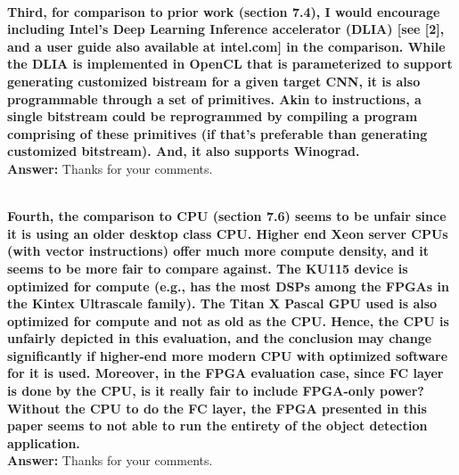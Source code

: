 \documentclass[12pt]{paper}
\newcommand{\rev}[1]{{{\color[rgb]{0,0,1}{#1}}}}
\newcommand{\answer}[1]{\noindent\textbf{Answer:} #1}
\newcommand{\comment}[1]{\noindent\textbf{\\ #1}\\}
\begin{document}
\comment{Third, for comparison to prior work (section 7.4), I would encourage including Intel’s Deep Learning Inference accelerator (DLIA) [see [2], and a user guide also available at intel.com] in the comparison. While the DLIA is implemented in OpenCL that is parameterized to support generating customized bistream for a given target CNN, it is also programmable through a set of primitives. Akin to instructions, a single bitstream could be reprogrammed by compiling a program comprising of these primitives (if that’s preferable than generating customized bitstream). And, it also supports Winograd. 
}
\answer{Thanks for your comments.}
\rev{We have corrected this error.}

\comment{Fourth, the comparison to CPU (section 7.6) seems to be unfair since it is using an older desktop class CPU. Higher end Xeon server CPUs (with vector instructions) offer much more compute density, and it seems to be more fair to compare against. The KU115 device is optimized for compute (e.g., has the most DSPs among the FPGAs in the Kintex Ultrascale family). The Titan X Pascal GPU used is also optimized for compute and not as old as the CPU. Hence, the CPU is unfairly depicted in this evaluation, and the conclusion may change significantly if higher-end more modern CPU with optimized software for it is used. Moreover, in the FPGA evaluation case, since FC layer is done by the CPU, is it really fair to include FPGA-only power? Without the CPU to do the FC layer, the FPGA presented in this paper seems to not able to run the entirety of the object detection application. 
}
\answer{Thanks for your comments.}
\rev{We have corrected this error.}
\end{document}
